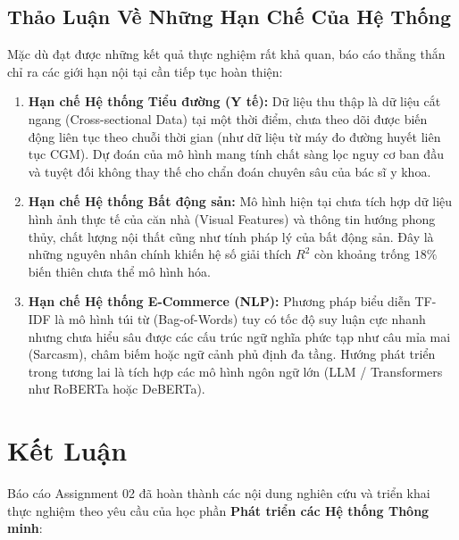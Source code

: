 \documentclass[12pt,a4paper]{report}
\begin{document}
\section{Thảo Luận Về Những Hạn Chế Của Hệ Thống}
Mặc dù đạt được những kết quả thực nghiệm rất khả quan, báo cáo thẳng thắn chỉ ra các giới hạn nội tại cần tiếp tục hoàn thiện:
\begin{enumerate}[leftmargin=2em]
    \item \textbf{Hạn chế Hệ thống Tiểu đường (Y tế):} Dữ liệu thu thập là dữ liệu cắt ngang (Cross-sectional Data) tại một thời điểm, chưa theo dõi được biến động liên tục theo chuỗi thời gian (như dữ liệu từ máy đo đường huyết liên tục CGM). Dự đoán của mô hình mang tính chất sàng lọc nguy cơ ban đầu và tuyệt đối không thay thế cho chẩn đoán chuyên sâu của bác sĩ y khoa.
    \item \textbf{Hạn chế Hệ thống Bất động sản:} Mô hình hiện tại chưa tích hợp dữ liệu hình ảnh thực tế của căn nhà (Visual Features) và thông tin hướng phong thủy, chất lượng nội thất cũng như tính pháp lý của bất động sản. Đây là những nguyên nhân chính khiến hệ số giải thích $R^2$ còn khoảng trống $18\%$ biến thiên chưa thể mô hình hóa.
    \item \textbf{Hạn chế Hệ thống E-Commerce (NLP):} Phương pháp biểu diễn TF-IDF là mô hình túi từ (Bag-of-Words) tuy có tốc độ suy luận cực nhanh nhưng chưa hiểu sâu được các cấu trúc ngữ nghĩa phức tạp như câu mỉa mai (Sarcasm), châm biếm hoặc ngữ cảnh phủ định đa tầng. Hướng phát triển trong tương lai là tích hợp các mô hình ngôn ngữ lớn (LLM / Transformers như RoBERTa hoặc DeBERTa).
\end{enumerate}

\chapter*{Kết Luận}

Báo cáo Assignment 02 đã hoàn thành các nội dung nghiên cứu và triển khai thực nghiệm theo yêu cầu của học phần \textbf{Phát triển các Hệ thống Thông minh}:
\end{document}
